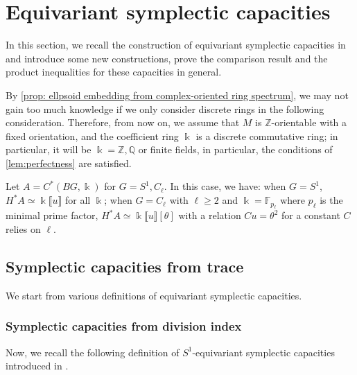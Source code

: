 \documentclass[11pt]{amsart}
\numberwithin{equation}{section}
\theoremstyle{plain}
\theoremstyle{definition}
\theoremstyle{remark}
\newcommand{\bF} { {\mathbb{F}}}
\newcommand{\bQ} { {\mathbb{Q}}}
\newcommand{\bZ} { {\mathbb{Z}}}
\newcommand{\fpw}[1]{{\llbracket #1\rrbracket}}
\begin{document}
\section{Equivariant symplectic capacities}\label{section: capacities}

In this section, we recall the construction of equivariant symplectic capacities in \cite{Capacities2021,CyclicZHANG} and introduce some new constructions, prove the comparison result and the product inequalities for these capacities in general. 

By \autoref{prop: ellpsoid embedding from complex-oriented ring spectrum}, we may not gain too much knowledge if we only consider discrete rings in the following consideration. Therefore, from now on, we assume that $M$ is $\bZ$-orientable with a fixed orientation, and the coefficient ring $\Bbbk$ is a discrete commutative ring; in particular, it will be $\Bbbk=\bZ,\bQ
$ or finite fields, in particular, the conditions of \autoref{lem:perfectness} are satisfied. 

Let $A=C^*(BG,\Bbbk)$ for $G=S^1,C_\ell$. In this case, we have: when $G=S^1$, $H^*A\simeq \Bbbk\fpw{u}$ for all $\Bbbk$; when $G=C_\ell$ with $\ell\geq 2$ and $\Bbbk=\bF_{p_\ell}$ where $p_\ell$ is the minimal prime factor, $H^*A\simeq \Bbbk\fpw{u}[\theta]$ with a relation $Cu=\theta^2$ for a constant $C$ relies on $\ell$.

\subsection{Symplectic capacities from trace}
We start from various definitions of equivariant symplectic capacities.

\subsubsection{Symplectic capacities from division index}\label{section: capacity from division index}
Now, we recall the following definition of $S^1$-equivariant symplectic capacities introduced in \cite{CyclicZHANG,Capacities2021}.
\end{document}
